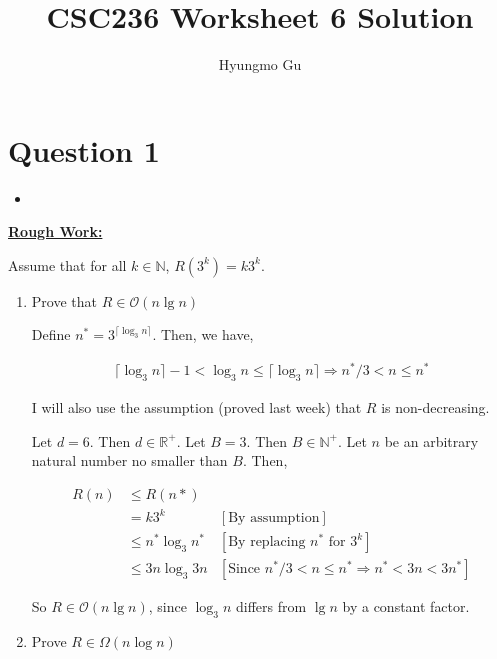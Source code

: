 \documentclass[12pt]{article}
\begin{document}
\title{CSC236 Worksheet 6 Solution}
\author{Hyungmo Gu}
\maketitle

\section*{Question 1}
\begin{itemize}
    \item

\end{itemize}

\bigskip

\begin{mdframed}
    \underline{\textbf{Rough Work:}}

    \bigskip

    Assume that for all $k \in \mathbb{N}$, $R(3^k) = k3^k$.

    \begin{enumerate}[1.]
        \item Prove that $R \in \mathcal{O}(n \lg n)$

        \bigskip

        Define $n^* = 3^{\lceil \log_3 n \rceil}$. Then, we have,

        \begin{align}
            \lceil \log_3 n \rceil - 1 < \log_3 n \leq \lceil \log_3 n \rceil \Rightarrow n^*/3 < n \leq n^*
        \end{align}

        I will also use the assumption (proved last week) that $R$ is non-decreasing.

        \bigskip

        Let $d = 6$. Then $d \in \mathbb{R}^+$. Let $B = 3$. Then $B \in \mathbb{N}^+$. Let
        $n$ be an arbitrary natural number no smaller than $B$. Then,

        \begin{mdframed}
        \begin{align}
        R(n) &\leq R(n*)\\
        &= k3^k & [\text{By assumption}]\\
        &\leq n^* \log_3 n^* & [\text{By replacing $n^*$ for $3^k$}]\\
        &\leq 3n \log_3 3n  & [\text{Since $n^*/3 < n \leq n^* \Rightarrow n^* < 3n < 3n^*$}]
        \end{align}

        \end{mdframed}

        So $R \in \mathcal{O}(n \lg n)$, since $\log_3 n$ differs from $\lg n$ by a constant factor.

        \item Prove $R \in \Omega(n \log n)$

        \begin{mdframed}

        \end{mdframed}
    \end{enumerate}

\end{mdframed}
\end{document}

